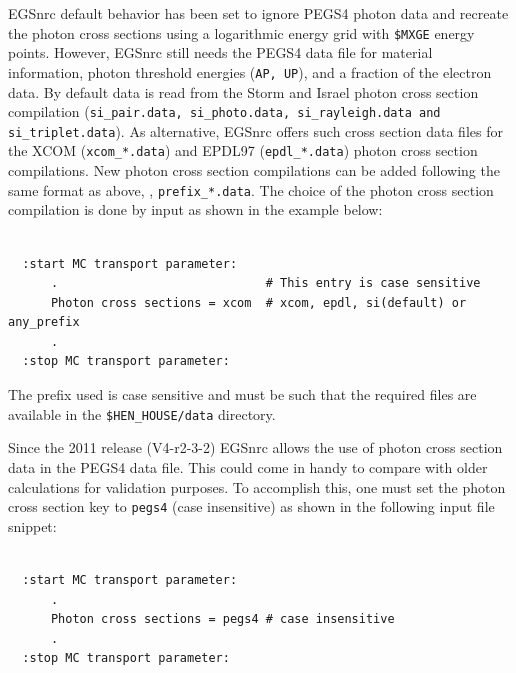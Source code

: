 EGSnrc default behavior has been set to ignore PEGS4 photon
data and recreate the photon cross sections using a logarithmic energy
grid with {\tt \$MXGE} energy points. However, EGSnrc still needs the
PEGS4 data file for material information, photon threshold energies
({\tt AP, UP}), and a fraction of the electron data.
By default data is read from the
Storm and Israel\cite{SI70} photon cross section compilation
({\tt si\_pair.data, si\_photo.data, si\_rayleigh.data and
si\_triplet.data}).
As alternative, EGSnrc offers such cross section data files
for the XCOM\cite{HS95} ({\tt xcom\_*.data}) and EPDL97\cite{Cu89}
({\tt epdl\_*.data}) photon cross section compilations.
New photon cross section compilations can be added following the
same format as above, \ie, {\tt prefix\_*.data}.
The choice of the photon cross section
compilation is done by input as shown in the example below:
\begin{verbatim}

  :start MC transport parameter:
      .                             # This entry is case sensitive
      Photon cross sections = xcom  # xcom, epdl, si(default) or any_prefix
      .
  :stop MC transport parameter:

\end{verbatim}
The prefix used is case sensitive and must be such that the required files
are available in the {\tt \$HEN\_HOUSE/data} directory.

Since the 2011 release (V4-r2-3-2) EGSnrc allows the
use of photon cross section data in the PEGS4 data file. This could
come in handy to compare with older calculations for validation
purposes. To accomplish this, one must set the photon cross section key to
{\tt pegs4} (case insensitive) as shown in the following input file snippet:
\begin{verbatim}

  :start MC transport parameter:
      .
      Photon cross sections = pegs4 # case insensitive
      .
  :stop MC transport parameter:

\end{verbatim}
